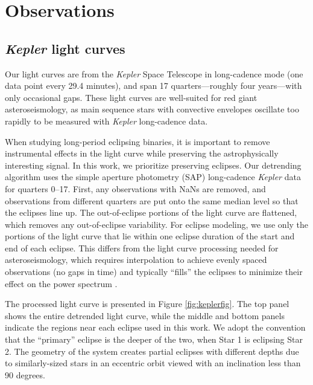 \section{Observations}\label{data}

\subsection{\emph{Kepler} light curves}\label{kepler}
Our light curves are from the \emph{Kepler} Space Telescope in long-cadence mode (one data point every 29.4 minutes), and span 17 quarters---roughly four years---with only occasional gaps. These light curves are well-suited for red giant asteroseismology, as main sequence stars with convective envelopes oscillate too rapidly to be measured with \emph{Kepler} long-cadence data.

When studying long-period eclipsing binaries, it is important to remove instrumental effects in the light curve while preserving the astrophysically interesting signal. In this work, we prioritize preserving eclipses. Our detrending algorithm uses the simple aperture photometry (SAP) long-cadence \emph{Kepler} data for quarters 0--17. First, any observations with NaNs are removed, and observations from different quarters are put onto the same median level so that the eclipses line up. The out-of-eclipse portions of the light curve are flattened, which removes any out-of-eclipse variability. For eclipse modeling, we use only the portions of the light curve that lie within one eclipse duration of the start and end of each eclipse. This differs from the light curve processing needed for asteroseismology, which requires interpolation to achieve evenly spaced observations (no gaps in time) and typically ``fills'' the eclipses to minimize their effect on the power spectrum \citep{gau14}.

The processed light curve is presented in Figure \ref{fig:keplerfig}. The top panel shows the entire detrended light curve, while the middle and bottom panels indicate the regions near each eclipse used in this work. We adopt the convention that the ``primary'' eclipse is the deeper of the two, when Star 1 is eclipsing Star 2. The geometry of the system creates partial eclipses with different depths due to similarly-sized stars in an eccentric orbit viewed with an inclination less than 90 degrees.
  
  
  
